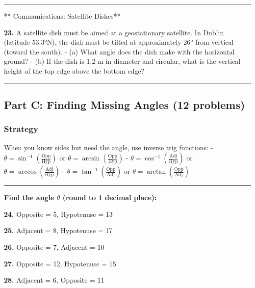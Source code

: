 \documentclass[
  11pt,
]{article}
\begin{document}
\begin{center}\rule{0.5\linewidth}{0.5pt}\end{center}

** Communications: Satellite Dishes**

\textbf{23.} A satellite dish must be aimed at a geostationary
satellite. In Dublin (latitude 53.3°N), the dish must be tilted at
approximately 26° from vertical (toward the south). - (a) What angle
does the dish make with the horizontal ground? - (b) If the dish is 1.2
m in diameter and circular, what is the vertical height of the top edge
above the bottom edge?

\begin{center}\rule{0.5\linewidth}{0.5pt}\end{center}

\hypertarget{part-c-finding-missing-angles-12-problems}{%
\subsection{Part C: Finding Missing Angles (12
problems)}\label{part-c-finding-missing-angles-12-problems}}

\hypertarget{strategy-1}{%
\subsubsection{Strategy}\label{strategy-1}}

When you know sides but need the angle, use inverse trig functions: -
\(\theta = \sin^{-1}\left(\frac{\text{Opp}}{\text{Hyp}}\right)\) or
\(\theta = \arcsin\left(\frac{\text{Opp}}{\text{Hyp}}\right)\) -
\(\theta = \cos^{-1}\left(\frac{\text{Adj}}{\text{Hyp}}\right)\) or
\(\theta = \arccos\left(\frac{\text{Adj}}{\text{Hyp}}\right)\) -
\(\theta = \tan^{-1}\left(\frac{\text{Opp}}{\text{Adj}}\right)\) or
\(\theta = \arctan\left(\frac{\text{Opp}}{\text{Adj}}\right)\)

\begin{center}\rule{0.5\linewidth}{0.5pt}\end{center}

\textbf{Find the angle \(\theta\) (round to 1 decimal place):}

\textbf{24.} Opposite = 5, Hypotenuse = 13

\textbf{25.} Adjacent = 8, Hypotenuse = 17

\textbf{26.} Opposite = 7, Adjacent = 10

\textbf{27.} Opposite = 12, Hypotenuse = 15

\textbf{28.} Adjacent = 6, Opposite = 11
\end{document}
